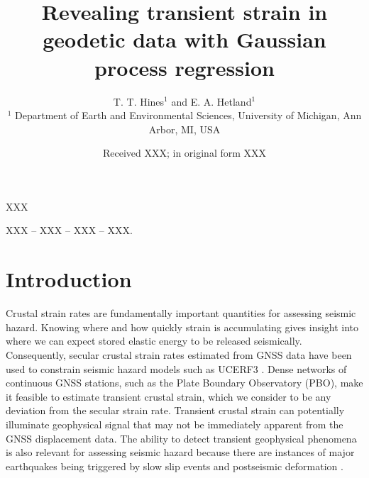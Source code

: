 \documentclass[extra,mreferee]{gji}
\title[Transient strain in geodetic data]
      {Revealing transient strain in geodetic data with Gaussian process regression}
\author[T. T. Hines and E. A. Hetland]
       {T. T. Hines$^1$ and E. A. Hetland$^1$ \\
        $^1$ Department of Earth and Environmental Sciences, University of Michigan, Ann Arbor, MI, USA}
\date{Received XXX; in original form XXX}
\begin{document}
\label{firstpage}

\maketitle

\begin{summary}
XXX
\end{summary}

\begin{keywords}
 XXX -- XXX -- XXX -- XXX.
\end{keywords}

\section{Introduction}\label{sec:Introduction}
Crustal strain rates are fundamentally important quantities for assessing seismic hazard. Knowing where and how quickly strain is accumulating gives insight into where we can expect stored elastic energy to be released seismically. Consequently, secular crustal strain rates estimated from GNSS data have been used to constrain seismic hazard models such as UCERF3 \citep{Field2014}. Dense networks of continuous GNSS stations, such as the Plate Boundary Observatory (PBO), make it feasible to estimate transient crustal strain, which we consider to be any deviation from the secular strain rate.  Transient crustal strain can potentially illuminate geophysical signal that may not be immediately apparent from the GNSS displacement data. The ability to detect transient geophysical phenomena is also relevant for assessing seismic hazard because there are instances of major earthquakes being triggered by slow slip events \citep{Roeloffs2006} and postseismic deformation \citep{Freed2001}. 
\end{document}
